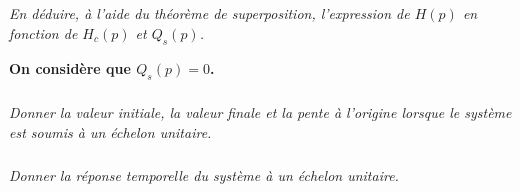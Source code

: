 \documentclass[10pt]{article}
\newif\ifprof
\begin{document}
\subparagraph{}
\textit{En déduire, à l’aide du théorème de superposition, l’expression de $H(p)$ en fonction de $H_c(p)$ et $Q_s(p)$.}

\ifprof
\begin{corrige}
\end{corrige}
\else
\fi

\vspace{.5cm}


\textbf{On considère que $Q_s(p)=0$.}

\subparagraph{}
\textit{Donner la valeur initiale, la valeur finale et la pente à l'origine lorsque le système est soumis à un échelon unitaire.}


\subparagraph{}
\textit{Donner la réponse temporelle du système à un échelon unitaire.}
\end{document}
